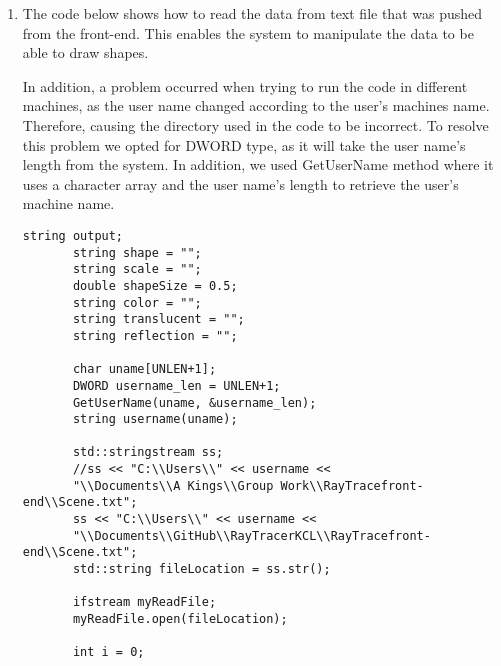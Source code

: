 \documentclass{article}
\begin{document}
\begin{enumerate}

\item The code below shows how to read the data from text file that was pushed from the front-end. This enables the system to manipulate the data to be able to draw shapes.

In addition, a problem occurred when trying to run the code in different machines, as the user name changed according to the user’s machines name. Therefore, causing the directory used in the code to be incorrect. To resolve this problem we opted for DWORD type, as it will take the user name’s length from the system. In addition, we used GetUserName method where it uses a character array and the user name’s length to retrieve the user’s machine name. 


     \begin{lstlisting}
string output;
       string shape = "";
       string scale = "";
       double shapeSize = 0.5;
       string color = "";
       string translucent = "";
       string reflection = "";

       char uname[UNLEN+1];
       DWORD username_len = UNLEN+1;
       GetUserName(uname, &username_len);
       string username(uname);

       std::stringstream ss;
       //ss << "C:\\Users\\" << username << 
       "\\Documents\\A Kings\\Group Work\\RayTracefront-end\\Scene.txt";
       ss << "C:\\Users\\" << username <<
       "\\Documents\\GitHub\\RayTracerKCL\\RayTracefront-end\\Scene.txt";
       std::string fileLocation = ss.str();

       ifstream myReadFile;
       myReadFile.open(fileLocation);

       int i = 0;


\end{lstlisting}
\end{enumerate}
\end{document}
